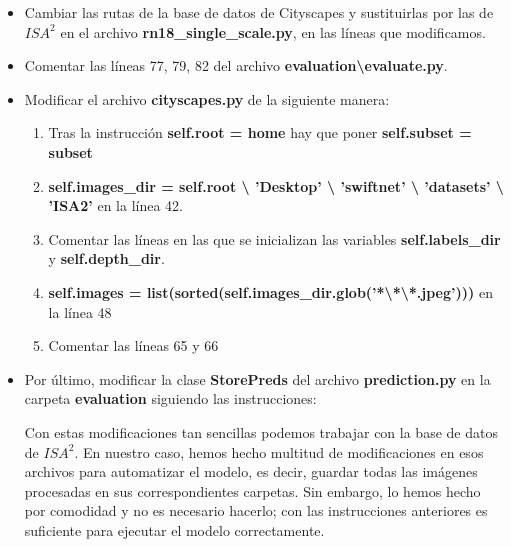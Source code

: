 \begin{itemize}
\item Cambiar las rutas de la base de datos de Cityscapes y sustituirlas por las de $ISA^{2}$ en el archivo \textbf{rn18\_single\_scale.py}, en las líneas que modificamos.
\item Comentar las líneas 77, 79, 82 del archivo \textbf{evaluation\textbackslash{evaluate.py}}.
\item Modificar el archivo \textbf{cityscapes.py} de la siguiente manera:

\begin{enumerate}
\item Tras la instrucción \textbf{self.root = home} hay que poner \textbf{self.subset = subset}
\item \textbf{self.images\_dir = self.root \textbackslash{} 'Desktop' \textbackslash{} 'swiftnet' \textbackslash{} 'datasets' \textbackslash{} 'ISA2'} en la línea 42.
\item Comentar las líneas en las que se inicializan las variables \textbf{self.labels\_dir} y \textbf{self.depth\_dir}.
\item \textbf{self.images = list(sorted(self.images\_dir.glob('*\textbackslash{*}\textbackslash{*.jpeg}')))} en la línea 48
\item Comentar las líneas 65 y 66
\end{enumerate}

\item Por último, modificar la clase \textbf{StorePreds} del archivo \textbf{prediction.py} en la carpeta \textbf{evaluation} siguiendo las instrucciones:


Con estas modificaciones tan sencillas podemos trabajar con la base de datos de $ISA^{2}$. En nuestro caso, hemos hecho multitud de modificaciones en esos archivos para automatizar el modelo, es decir, guardar todas las imágenes procesadas en sus correspondientes carpetas. Sin embargo, lo hemos hecho por comodidad y no es necesario hacerlo; con las instrucciones anteriores es suficiente para ejecutar el modelo correctamente.


\end{itemize}
